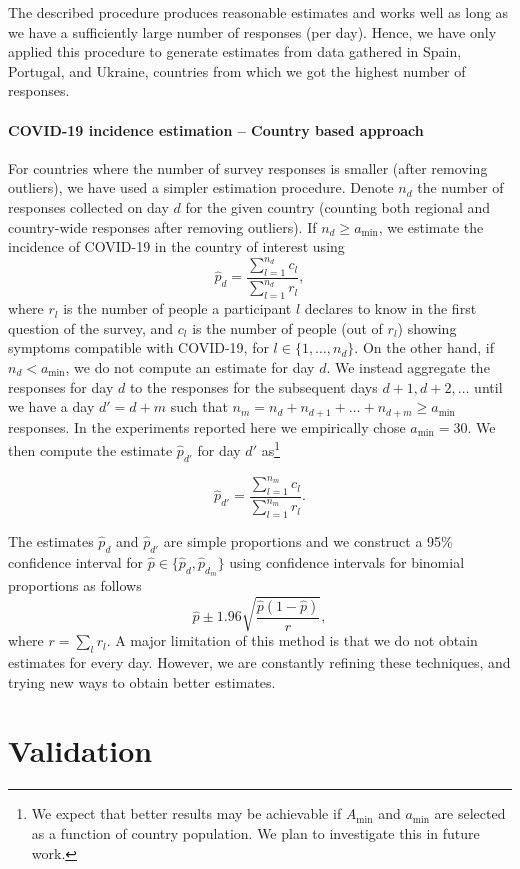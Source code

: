 \documentclass[sigconf]{acmart}
\begin{document}
The described procedure produces reasonable estimates 
and works well as long as we have a sufficiently large number of responses (per day).  
Hence, we have only applied this procedure to generate estimates from data gathered in Spain, Portugal, and Ukraine, countries from which we got the highest number of responses. 

\paragraph{COVID-19 incidence estimation -- Country based approach}
For countries where the number of survey responses is smaller (after removing outliers), we have used a simpler estimation procedure. Denote $n_d$ the number of responses collected on day $d$ for the given country (counting both regional and country-wide responses after removing outliers). If $n_d \geq a_{\min}$, we estimate the incidence of COVID-19 in the country of interest using
$$
\hat{p}_d = \frac{\sum_{l = 1}^{n_d} c_l}{\sum_{l = 1}^{n_d} r_l},
$$
where $r_l$ is the number of people a participant $l$ declares to know in the first question of the survey, and $c_l$ is the number of people (out of $r_l$) showing symptoms compatible with COVID-19, for $l \in \{1,\ldots, n_d\}$. On the other hand, if $n_d < a_{\min}$, we do not compute an estimate for day $d$. We instead aggregate the responses for day $d$ to the responses for the subsequent days $d+1, d+2, \ldots$ until we have a day $d'=d+m$ such that $n_m = n_d + n_{d+1} + \ldots + n_{d+m} \geq a_{\min}$ responses. In the experiments reported here we empirically chose $a_{\min}=30$.  We then compute the estimate $\hat{p}_{d'}$ for day $d'$ as\footnote{We expect that better results may be achievable if $A_{\min}$ and $a_{\min}$ are selected as a function of country population. We plan to investigate this in future work.}

$$\hat{p}_{d'} = \frac{\sum_{l = 1}^{n_m} c_l}{\sum_{l = 1}^{n_m} r_l}.$$

The estimates $\hat{p}_d$ and $\hat{p}_{d'}$ are simple proportions and we construct a 95\% confidence interval for $\hat{p} \in \{\hat{p}_d, \hat{p}_{d_m}\}$ using confidence intervals for binomial proportions as follows
$$\hat{p} \pm 1.96\sqrt{\frac{\hat{p}(1-\hat{p})}{r}},$$
where $r = \sum_{l} r_l$. A major limitation of this method is that we do not obtain estimates for every day. However, we are constantly refining these techniques, and trying new ways to obtain better estimates. 


\section{Validation}
\end{document}
